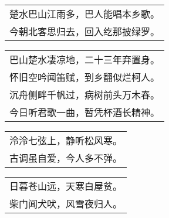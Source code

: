 \nopagebreak%
\nopagebreak%
\noindent\begin{minipage}{\linewidth}
  \vskip-3pt\begin{table}[H]
    \centering
    \begin{tabular}{@{}l@{}}
楚水巴山江雨多，巴人能唱本乡歌。\\
今朝北客思归去，回入纥那披绿罗。
    \end{tabular}
  \end{table}
\end{minipage}
\vspace{1cm}


\nopagebreak%
\nopagebreak%
\noindent\begin{minipage}{\linewidth}
  \vskip-3pt\begin{table}[H]
    \centering
    \begin{tabular}{@{}l@{}}
巴山楚水凄凉地，二十三年弃置身。\\
怀旧空吟闻笛赋，到乡翻似烂柯人。\\
沉舟侧畔千帆过，病树前头万木春。\\
今日听君歌一曲，暂凭杯酒长精神。
    \end{tabular}
  \end{table}
\end{minipage}
\vspace{1cm}


\nopagebreak%
\nopagebreak%
\noindent\begin{minipage}{\linewidth}
  \vskip-3pt\begin{table}[H]
    \centering
    \begin{tabular}{@{}l@{}}
泠泠七弦上，静听松风寒。\\
古调虽自爱，今人多不弹。
    \end{tabular}
  \end{table}
\end{minipage}
\vspace{1cm}


\nopagebreak%
\nopagebreak%
\noindent\begin{minipage}{\linewidth}
  \vskip-3pt\begin{table}[H]
    \centering
    \begin{tabular}{@{}l@{}}
日暮苍山远，天寒白屋贫。\\
柴门闻犬吠，风雪夜归人。
    \end{tabular}
  \end{table}
\end{minipage}
\vspace{1cm}


